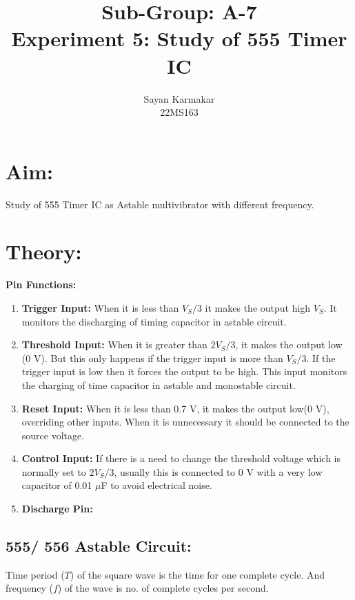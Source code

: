 \documentclass[12pt]{article}
\begin{document}
	\title{Sub-Group: A-7 \\ Experiment 5: Study of 555 Timer IC}
	
	
	\author{Sayan Karmakar \\22MS163 }
	\date{}
	\maketitle

\section{Aim:}
Study of 555 Timer IC as Astable multivibrator with different frequency.
\section{Theory:}
\textbf{Pin Functions: }
\begin{enumerate}
	\item \textbf{Trigger Input:} When it is less than $V_S/3$ it makes the output high $V_S$. It monitors the discharging of timing capacitor in astable circuit.
	\item \textbf{Threshold Input:} When it is greater than $2 V_S/ 3$, it makes the output low (0 V). But this only happens if the trigger input is more than $V_S/ 3$. If the trigger input is low then it forces the output to be high. This input monitors the charging of time capacitor in astable and monostable circuit.
	\item \textbf{Reset Input:} When it is less than 0.7 V, it makes the output low(0 V), overriding other inputs. When it is unnecessary it should be connected to the source voltage.
	\item \textbf{Control Input:} If there is a need to change the threshold voltage which is normally set to $2 V_S/3$, 	usually this is connected to 0 V with a very low capacitor of 0.01 $\mu$F to avoid electrical noise.
	\item \textbf{Discharge Pin: }
\end{enumerate}

\subsection{555/ 556 Astable Circuit:}
Time period ($T$) of the square wave is the time for one complete cycle. And frequency ($f$) of the wave is no. of complete cycles per second.
\end{document}
